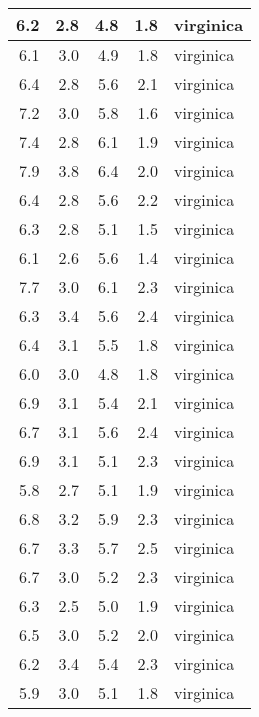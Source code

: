 \begin{tabular}{r|r|r|r|l}
\hline
6.2 & 2.8 & 4.8 & 1.8 & virginica\\
\hline
6.1 & 3.0 & 4.9 & 1.8 & virginica\\
\hline
6.4 & 2.8 & 5.6 & 2.1 & virginica\\
\hline
7.2 & 3.0 & 5.8 & 1.6 & virginica\\
\hline
7.4 & 2.8 & 6.1 & 1.9 & virginica\\
\hline
7.9 & 3.8 & 6.4 & 2.0 & virginica\\
\hline
6.4 & 2.8 & 5.6 & 2.2 & virginica\\
\hline
6.3 & 2.8 & 5.1 & 1.5 & virginica\\
\hline
6.1 & 2.6 & 5.6 & 1.4 & virginica\\
\hline
7.7 & 3.0 & 6.1 & 2.3 & virginica\\
\hline
6.3 & 3.4 & 5.6 & 2.4 & virginica\\
\hline
6.4 & 3.1 & 5.5 & 1.8 & virginica\\
\hline
6.0 & 3.0 & 4.8 & 1.8 & virginica\\
\hline
6.9 & 3.1 & 5.4 & 2.1 & virginica\\
\hline
6.7 & 3.1 & 5.6 & 2.4 & virginica\\
\hline
6.9 & 3.1 & 5.1 & 2.3 & virginica\\
\hline
5.8 & 2.7 & 5.1 & 1.9 & virginica\\
\hline
6.8 & 3.2 & 5.9 & 2.3 & virginica\\
\hline
6.7 & 3.3 & 5.7 & 2.5 & virginica\\
\hline
6.7 & 3.0 & 5.2 & 2.3 & virginica\\
\hline
6.3 & 2.5 & 5.0 & 1.9 & virginica\\
\hline
6.5 & 3.0 & 5.2 & 2.0 & virginica\\
\hline
6.2 & 3.4 & 5.4 & 2.3 & virginica\\
\hline
5.9 & 3.0 & 5.1 & 1.8 & virginica\\
\hline
\end{tabular}
